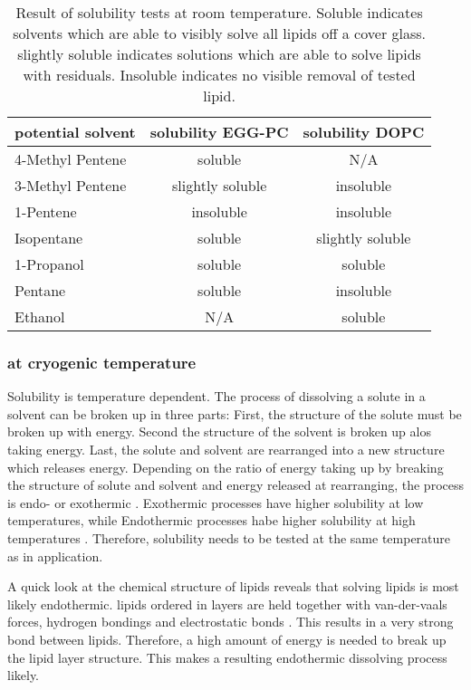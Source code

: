 \begin{table}[hbt!]
	\centering
	\begin{tabular}{|l|c|c|}
		\hline
		potential solvent & solubility EGG-PC & solubility DOPC \\
		\hline
		\hline
		4-Methyl Pentene & soluble & N/A  \\ 
		\hline
		3-Methyl Pentene & slightly soluble & insoluble \\
		\hline
		1-Pentene & insoluble & insoluble \\
		\hline
		Isopentane & soluble & slightly soluble\\
		\hline
		1-Propanol & soluble & soluble\\
		\hline
		Pentane & soluble & insoluble\\
		\hline
		Ethanol & N/A & soluble\\
		\hline
	\end{tabular}
	\caption{Result of solubility tests at room temperature. Soluble indicates solvents which are able to visibly solve all lipids off a cover glass. slightly soluble indicates solutions which are able to solve lipids with residuals. Insoluble indicates no visible removal of tested lipid.}
	\label{table:LoeslichkeitRaumtemperatur}
\end{table}



\subsubsection{at cryogenic temperature}
\label{chapter:meltingtemp}

Solubility is temperature dependent. The process of dissolving a solute in a solvent can be broken up in three parts: First, the structure of the solute must be broken up with energy. Second the structure of the solvent is broken up alos taking energy. Last, the solute and solvent are rearranged into a new structure which releases energy. Depending on the ratio of energy taking up by breaking the structure of solute and solvent and energy released at rearranging, the process is endo- or exothermic \cite{ZafirJaveed.}. Exothermic processes have higher solubility at low temperatures, while Endothermic processes habe higher solubility at high temperatures \cite{Mortimer.2007}. Therefore, solubility needs to be tested at the same temperature as in application.

A quick look at the chemical structure of lipids reveals that solving lipids is most likely endothermic. lipids ordered in layers are held together with van-der-vaals forces, hydrogen bondings and electrostatic bonds \cite{RWayneAlbers.1999}. This results in a very strong bond between lipids. Therefore, a high amount of energy is needed to break up the lipid layer structure. This makes a resulting endothermic dissolving process likely.

